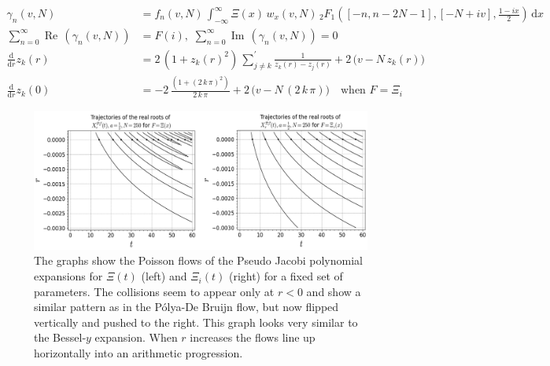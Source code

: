 \documentclass[a4paper,11pt,twoside]{amsart}
\renewcommand\Re{{\operatorname{Re\,}}}
\renewcommand\Im{{\operatorname{Im\,}}}
\begin{document}
\begin{small}
{\begin{minipage}{\textwidth}
\begin{align}
  \gamma_n(v,N) &= f_n(v,N)\,\int_{-\infty}^{\infty} \Xi(x)\,w_x(v,N)\,{}_2F_1\left([-n, n-2N-1],[-N+iv],\frac{1-ix}{2}\right)\,\mathrm{d}x \\
  \sum_{n=0}^\infty \Re(\gamma_n(v,N)) &= F(i), \,\,\sum_{n=0}^\infty \Im(\gamma_n(v,N)) = 0 \\
  \frac{\mathrm{d}}{\mathrm{d} r} z_k(r)&=2\,(1+z_k(r)^2)\,\sum_{j \ne k}^{'} \frac{1}{z_k(r)-z_j(r)} + 2\,\big(v-N\,z_k(r)\big)\\
  \frac{\mathrm{d}}{\mathrm{d} r} z_k(0)&=-2\,\frac{(1+(2\,k\,\pi)^2)}{2\,k\,\pi}+ 2\,\big(v-N\,(2\,k\,\pi)\big) \quad \text{when } F=\Xi_i
\end{align}
\end{minipage}}
\begin{figure}[H]
  \includegraphics[width=1\linewidth]{PseudoJacobiFlowdouble.jpeg}
  \caption{The graphs show the Poisson flows of the Pseudo Jacobi polynomial expansions for $\Xi(t)$ (left) and $\Xi_i(t)$ (right) for a fixed set of parameters. The collisions seem to appear only at $r < 0$ and show a similar pattern as in the Pólya-De Bruijn flow, but now flipped vertically and pushed to the right. This graph looks very similar to the Bessel-$y$ expansion. When $r$ increases the flows line up horizontally into an arithmetic progression.}
  \label{fig:flowPJ}
\end{figure}
\pagebreak
\noindent{}
\end{small}
\end{document}
